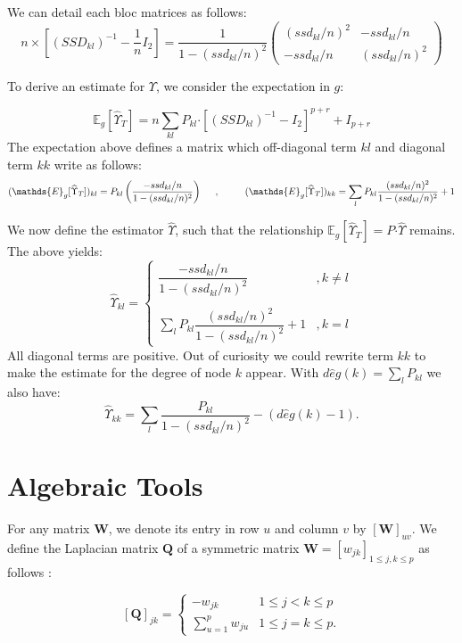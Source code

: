 \documentclass[11pt,a4paper]{article}
\newcommand{\Wbf}{\boldsymbol{W}}
\newcommand{\Qbf}{\boldsymbol{Q}}
\newcommand{\Esp}{\mathds{E}}
\newcommand{\had}{\boldsymbol{\cdot}}
\begin{document}
We can detail each bloc matrices as follows:
\[
n\times [(SSD_{kl})^{-1} - \frac{1}{n}I_2] = \frac{1}{1-(ssd_{kl}/n)^2}
\left(\begin{array}{cc}
		(ssd_{kl}/n)^2   & -ssd_{kl}/n\\
		-ssd_{kl}/n& (ssd_{kl}/n)^2 
		\end{array}\right)
\]

To derive an estimate for $\Upsilon$, we consider the expectation in $g$:

$$\Esp_g[\widehat{\Upsilon}_T]= n\sum_{kl} P_{kl} \had [(SSD_{kl})^{-1} - I_2]^{p+r} + I_{p+r}$$
 The expectation above defines a matrix which off-diagonal term $kl$ and diagonal term $kk$ write as follows:
$$(\Esp_g[\widehat{\Upsilon}_T])_{kl} = P_{kl} \left(\frac{-ssd_{kl}/n}{1-(ssd_{kl}/n)^2} \right)\text{\hspace{0.5cm},\hspace{1cm}}(\Esp_g[\widehat{\Upsilon}_T])_{kk} = \sum_l P_{kl} \frac{(ssd_{kl}/n)^2}{1-(ssd_{kl}/n)^2} +1 $$
 
 We now define the estimator $\widehat{\Upsilon}$, such that the relationship $\Esp_g[\widehat{\Upsilon}_T]=P\had \widehat{\Upsilon}$ remains. The above yields:
 \[ \boxed{\widehat{\Upsilon}_{kl}=\left\{\begin{array}{cl}
  \dfrac{-ssd_{kl}/n}{1-(ssd_{kl}/n)^2} & ,k\neq l\\\\
 \sum_l P_{kl} \dfrac{(ssd_{kl}/n)^2}{1-(ssd_{kl}/n)^2} +1 & ,k=l
 \end{array}\right.
 }\]
All diagonal terms are positive. Out of curiosity we could rewrite term $kk$ to make the estimate for the degree of node $k$ appear. With $d\widehat{e}g(k)=\sum_l P_{kl}$ we also have:
$$\widehat{\Upsilon}_{kk} =\sum_l \frac{P_{kl} }{1-(ssd_{kl}/n)^2} -(d\widehat{e}g(k)-1).$$
 
\newpage

 \appendix
 \section{Algebraic Tools}
 For any matrix $\Wbf$, we denote its entry in row $u$ and column $v$ by $[\Wbf]_{uv}$. We define the Laplacian matrix $\Qbf$ of a symmetric matrix $\Wbf=[w_{jk} ]_{1\leq j,k\leq p}$ as follows :
 
\[
 [\Qbf]_{jk}  =\begin{cases}
    -w_{jk}  & 1\leq j<k \leq p\\
    \sum_{u=1}^p w_{ju} & 1\leq j=k \leq p.
    \end{cases}
\]
 
\end{document}
